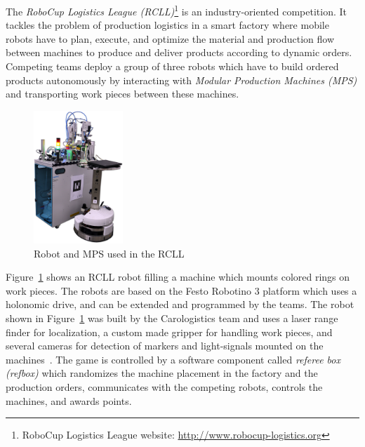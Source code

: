 \documentclass[a4paper,11pt]{article}
\newcommand{\reffig}[1]{Figure~\ref{#1}}
\begin{document}
The \emph{RoboCup Logistics League (RCLL)}\footnote{RoboCup Logistics
  League website: \url{http://www.robocup-logistics.org}}
is an industry-oriented competition.  It tackles
the problem of production logistics in a smart factory where mobile
robots have to plan, execute, and optimize the material and production
flow between machines to produce and deliver products according to
dynamic orders. Competing teams deploy a group of three robots
which have to build ordered products autonomously by interacting with
\emph{Modular Production Machines (MPS)} and transporting work pieces
between these machines.
\begin{figure}
  \centering
  \vspace{-2.7ex}
  \includegraphics[width=0.3\textwidth]{img/rcll}
  \vspace{-4ex}
  \caption{Robot and MPS used in the RCLL~\cite{chapter-cps}}
  \label{fig:rcll}
\end{figure}
\reffig{fig:rcll} shows an RCLL robot filling
a machine which mounts colored rings on work pieces. The robots are
based on the Festo Robotino 3 platform which uses a holonomic drive,
and can be extended and programmed by the teams. The robot shown in
\reffig{fig:rcll} was built by the Carologistics team and uses a
laser range finder for localization, a custom made gripper for
handling work pieces, and several cameras for detection of markers and
light-signals mounted on the machines~\cite{Carologistics2015,chapter-cps}. The
game is controlled by a software component called \emph{referee box
  (refbox)} which randomizes the machine placement in the factory and
the production orders, communicates with the competing robots,
controls the machines, and awards points.
\end{document}
